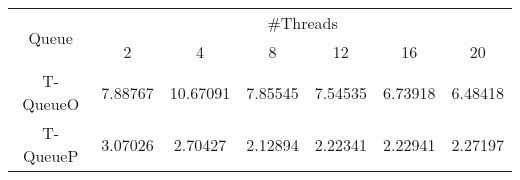 \begin{tabular}{|c|c|c|c|c|c|c|}
\hline
\multirow{2}{*}{Queue} & \multicolumn{6}{c|}{\#Threads}\\\cline{2-7}& 2 & 4 & 8 & 12 & 16 & 20\\
\hline
\hline
T-QueueO & 7.88767 & 10.67091 & 7.85545 & 7.54535 & 6.73918 & 6.48418\\
T-QueueP & 3.07026 & 2.70427 & 2.12894 & 2.22341 & 2.22941 & 2.27197\\
\hline\end{tabular}
